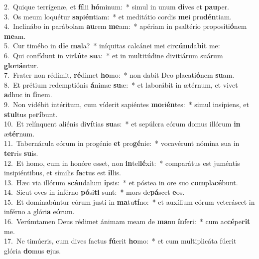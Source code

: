 {2.~}Quique terrígenæ, et \textbf{fí}lii \textbf{hó}minum:~* simul in unum \textbf{di}ves et \textbf{pau}per.\\
{3.~}Os meum loquétur \textbf{sa}pi\textbf{én}tiam:~* et meditátio cordis \textbf{me}i pru\textbf{dén}tiam.\\
{4.~}Inclinábo in parábolam \textbf{au}rem \textbf{me}am:~* apériam in psaltério propositi\textbf{ó}nem \textbf{me}am.\\
{5.~}Cur timébo in \textbf{di}e \textbf{ma}la?~* iníquitas calcánei mei cir\textbf{cúm}da\textbf{bit} me:\\
{6.~}Qui confídunt in vir\textbf{tú}te \textbf{su}a:~* et in multitúdine divitiárum suárum \textbf{glo}ri\textbf{án}tur.\\
{7.~}Frater non rédimit, \textbf{ré}dimet \textbf{ho}mo:~* non dabit Deo placati\textbf{ó}nem \textbf{su}am.\\
{8.~}Et prétium redemptiónis \textbf{á}nimæ \textbf{su}æ:~* et laborábit in ætérnum, et vivet \textbf{a}dhuc in \textbf{fi}nem.\\
{9.~}Non vidébit intéritum, cum víderit sapiéntes \textbf{mo}ri\textbf{én}tes:~* simul insípiens, et \textbf{stul}tus pe\textbf{rí}bunt.\\
{10.~}Et relínquent aliénis di\textbf{ví}tias \textbf{su}as:~* et sepúlcra eórum domus illórum \textbf{in} æ\textbf{tér}num.\\
{11.~}Tabernácula eórum in progénie \textbf{et} pro\textbf{gé}nie:~* vocavérunt nómina sua in \textbf{ter}ris \textbf{su}is.\\
{12.~}Et homo, cum in honóre esset, non \textbf{in}tel\textbf{lé}xit:~* comparátus est juméntis insipiéntibus, et símilis \textbf{fa}ctus est \textbf{il}lis.\\
{13.~}Hæc via illórum \textbf{scán}dalum \textbf{i}psis:~* et póstea in ore suo \textbf{com}pla\textbf{cé}bunt.\\
{14.~}Sicut oves in inférno \textbf{pó}si\textbf{ti} sunt:~* mors de\textbf{pá}scet \textbf{e}os.\\
{15.~}Et dominabúntur eórum justi in \textbf{ma}tu\textbf{tí}no:~* et auxílium eórum veteráscet in inférno a glóri\textbf{a} e\textbf{ó}rum.\\
{16.~}Verúmtamen Deus rédimet ánimam meam de \textbf{ma}nu \textbf{ín}feri:~* cum ac\textbf{cé}pe\textbf{rit} me.\\
{17.~}Ne timúeris, cum dives factus \textbf{fú}erit \textbf{ho}mo:~* et cum multiplicáta fúerit glória \textbf{do}mus \textbf{e}jus.\\
